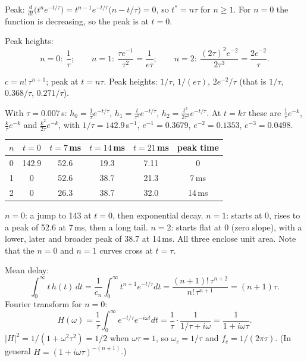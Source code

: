 \documentclass[10pt,letterpaper]{article}
\newcommand{\ans}[1]{\par\vspace{3pt}{\bfseries #1}\quad}
\begin{document}
Peak: $\frac{d}{dt}\big(t^n e^{-t/\tau}\big) = t^{n-1}e^{-t/\tau}\big(n - t/\tau\big) = 0$, so $t^* = n\tau$ for $n \ge 1$. For $n = 0$ the function is decreasing, so the peak is at $t = 0$.

Peak heights:
\[
n=0:\ \frac{1}{\tau}; \qquad n=1:\ \frac{\tau e^{-1}}{\tau^2} = \frac{1}{e\tau}; \qquad n=2:\ \frac{(2\tau)^2e^{-2}}{2\tau^3} = \frac{2e^{-2}}{\tau}.
\]
\begin{result}
$c = n!\,\tau^{n+1}$; peak at $t = n\tau$. Peak heights: $1/\tau$, $1/(e\tau)$, $2e^{-2}/\tau$ (that is $1/\tau$, $0.368/\tau$, $0.271/\tau$).
\end{result}

\ans{5b.}
With $\tau = 0.007$\,s: $h_0 = \frac{1}{\tau}e^{-t/\tau}$, $h_1 = \frac{t}{\tau^2}e^{-t/\tau}$, $h_2 = \frac{t^2}{2\tau^3}e^{-t/\tau}$. At $t = k\tau$ these are $\frac1\tau e^{-k}$, $\frac{k}{\tau}e^{-k}$ and $\frac{k^2}{2\tau}e^{-k}$, with $1/\tau = 142.9$\,s$^{-1}$, $e^{-1} = 0.3679$, $e^{-2} = 0.1353$, $e^{-3} = 0.0498$.

\begin{center}
\begin{tabular}{cccccc}
\toprule
$n$ & $t=0$ & $t=7$\,ms & $t=14$\,ms & $t=21$\,ms & peak time \\
\midrule
0 & 142.9 & 52.6 & 19.3 & 7.11 & 0 \\
1 & 0 & 52.6 & 38.7 & 21.3 & 7\,ms \\
2 & 0 & 26.3 & 38.7 & 32.0 & 14\,ms \\
\bottomrule
\end{tabular}
\end{center}
\begin{sketch}
$n = 0$: a jump to 143 at $t = 0$, then exponential decay. $n = 1$: starts at 0, rises to a peak of 52.6 at 7\,ms, then a long tail. $n = 2$: starts flat at 0 (zero slope), with a lower, later and broader peak of 38.7 at 14\,ms. All three enclose unit area. Note that the $n = 0$ and $n = 1$ curves cross at $t = \tau$.
\end{sketch}

\ans{5c.}
Mean delay:
\[
\int_0^\infty t\,h(t)\,dt = \frac{1}{c_n}\int_0^\infty t^{n+1}e^{-t/\tau}dt = \frac{(n+1)!\,\tau^{n+2}}{n!\,\tau^{n+1}} = (n+1)\tau.
\]
Fourier transform for $n = 0$:
\[
H(\omega) = \frac1\tau\int_0^\infty e^{-t/\tau}e^{-i\omega t}dt = \frac1\tau\cdot\frac{1}{1/\tau + i\omega} = \frac{1}{1 + i\omega\tau}.
\]
$|H|^2 = 1/(1 + \omega^2\tau^2) = 1/2$ when $\omega\tau = 1$, so $\omega_c = 1/\tau$ and $f_c = 1/(2\pi\tau)$. (In general $H = (1 + i\omega\tau)^{-(n+1)}$.)
\end{document}
